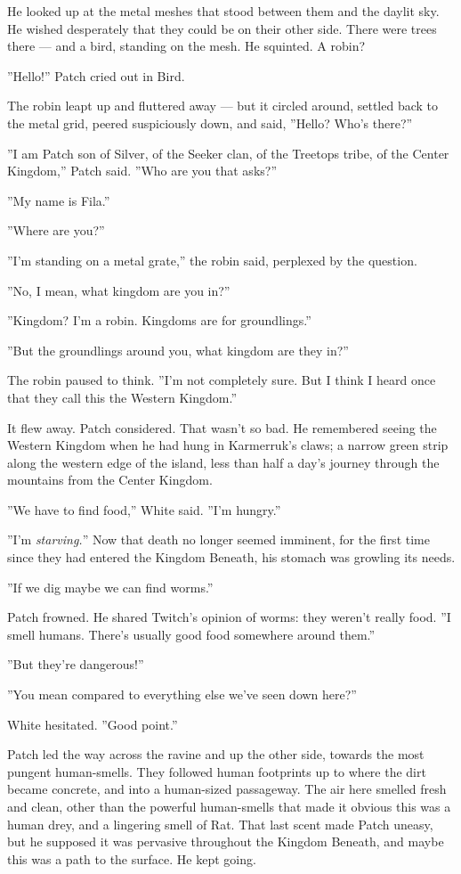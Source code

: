 \documentclass[12pt]{book}
\begin{document}
He looked up at the metal meshes that stood between them and the
daylit sky. He wished desperately that they could be on their other
side. There were trees there --- and a bird, standing on the mesh. He
squinted. A robin?

''Hello!'' Patch cried out in Bird.

The robin leapt up and fluttered away --- but it circled around,
settled back to the metal grid, peered suspiciously down, and said,
''Hello? Who's there?''

''I am Patch son of Silver, of the Seeker clan, of the Treetops tribe,
of the Center Kingdom,'' Patch said. ''Who are you that asks?''

''My name is Fila.''

''Where are you?''

''I'm standing on a metal grate,'' the robin said, perplexed by the
question.

''No, I mean, what kingdom are you in?''

''Kingdom? I'm a robin. Kingdoms are for groundlings.''

''But the groundlings around you, what kingdom are they in?''

The robin paused to think. ''I'm not completely sure. But I think I
heard once that they call this the Western Kingdom.''

It flew away. Patch considered. That wasn't so bad. He remembered
seeing the Western Kingdom when he had hung in Karmerruk's claws; a
narrow green strip along the western edge of the island, less than
half a day's journey through the mountains from the Center Kingdom.

''We have to find food,'' White said. ''I'm hungry.''

''I'm \textit{starving.}'' Now that death no longer seemed imminent,
for the first time since they had entered the Kingdom Beneath, his
stomach was growling its needs.

''If we dig maybe we can find worms.''

Patch frowned. He shared Twitch's opinion of worms: they weren't
really food. ''I smell humans. There's usually good food somewhere
around them.''

''But they're dangerous!''

''You mean compared to everything else we've seen down here?''

White hesitated. ''Good point.''

Patch led the way across the ravine and up the other side, towards the
most pungent human-smells. They followed human footprints up to where
the dirt became concrete, and into a human-sized passageway. The air
here smelled fresh and clean, other than the powerful human-smells
that made it obvious this was a human drey, and a lingering smell of
Rat. That last scent made Patch uneasy, but he supposed it was
pervasive throughout the Kingdom Beneath, and maybe this was a path to
the surface. He kept going.
\end{document}
